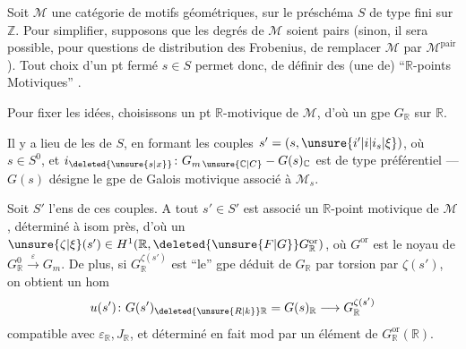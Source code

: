Soit $\mathcal M$ une catégorie de motifs géométriques,  sur le préschéma $S$ de type fini sur $\mathbb Z$. Pour simplifier, supposons que les degrés de $\mathcal M$ soient pairs (sinon, il sera possible, pour   questions de distribution des Frobenius, de remplacer $\mathcal M$ par $\mathcal M^{\mathrm{pair}}$). Tout choix d'un pt fermé $s\in S$ permet donc, de définir des (une  de) ``$\mathbb R$-points Motiviques''  .

Pour fixer les idées, choisissons un pt $\mathbb R$-motivique de $\mathcal M$, d'où un gpe  $G_{\mathbb R}$ sur $\mathbb R$.

Il y a lieu de   les   de $S$, en formant les couples $s'=(s,\unsure{i'|i|i_s|\xi})$, où $s\in S^0$, et
$i_{\deleted{\unsure{s|x}}}\colon G_{m\,\unsure{\mathbb C|C}}-G(s)_{\mathbb C}$ est de type  préférentiel --- $G(s)$ désigne le gpe de Galois motivique associé à $\mathcal M_s$.

 Soit $S'$ l'ens de ces couples. A tout $s'\in S'$ est associé un $\mathbb R$-point motivique de $\mathcal M$,  déterminé à isom près, d'où un $\unsure{\zeta|\xi}(s')\in H^1(\mathbb R,\deleted{\unsure{F|G}}G_{\mathbb R}^{\mathrm{or}})$, où $G^{\mathrm{or}}$ est le noyau de $G_{\mathbb R}^0\xrightarrow{\varepsilon}G_m$. De plus, si $G_{\mathbb R}^{\zeta(s')}$ est ``le'' gpe déduit de $G_{\mathbb R}$ par torsion par $\zeta(s')$, on obtient un hom
\[
u(s')\colon G(s')_{\deleted{\unsure{R|k}}\mathbb R}=G(s)_{\mathbb R}\longrightarrow G_{\mathbb R}^{\zeta(s')}
\]
compatible avec $\varepsilon_{\mathbb R},J_{\mathbb R}$, et déterminé en fait mod    par un élément de $G_{\mathbb R}^{\mathrm{or}}(\mathbb R)$.
